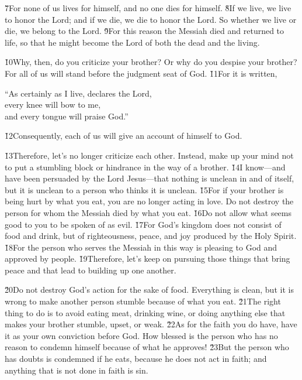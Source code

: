 \v{7}For none of us lives for himself, and no one dies for himself. \v{8}If we live, we live to honor the Lord; and if we die, we die to honor the Lord. So whether we live or die, we belong to the Lord. \v{9}For this reason the Messiah died and returned to life, so that he might become the Lord of both the dead and the living.

\v{10}Why, then, do you criticize your brother? Or why do you despise your brother? For all of us will stand before the judgment seat of God. \v{11}For it is written,

\begin{poetry}
\poeml ``As certainly as I live, declares the Lord, \\
\poemll    every knee will bow to me, \\
\poemlll       and every tongue will praise God.''
\end{poetry}

\v{12}Consequently, each of us will give an account of himself to God.

\v{13}Therefore, let's no longer criticize each other. Instead, make up your mind not to put a stumbling block or hindrance in the way of a brother. \v{14}I know---and have been persuaded by the Lord Jesus---that nothing is unclean in and of itself, but it is unclean to a person who thinks it is unclean. \v{15}For if your brother is being hurt by what you eat, you are no longer acting in love. Do not destroy the person for whom the Messiah died by what you eat. \v{16}Do not allow what seems good to you to be spoken of as evil. \v{17}For God's kingdom does not consist of food and drink, but of righteousness, peace, and joy produced by the Holy Spirit. \v{18}For the person who serves the Messiah in this way is pleasing to God and approved by people. \v{19}Therefore, let's keep on pursuing those things that bring peace and that lead to building up one another.

\v{20}Do not destroy God's action for the sake of food. Everything is clean, but it is wrong to make another person stumble because of what you eat. \v{21}The right thing to do is to avoid eating meat, drinking wine, or doing anything else that makes your brother stumble, upset, or weak. \v{22}As for the faith you do have, have it as your own conviction before God. How blessed is the person who has no reason to condemn himself because of what he approves! \v{23}But the person who has doubts is condemned if he eats, because he does not act in faith; and anything that is not done in faith is sin.

